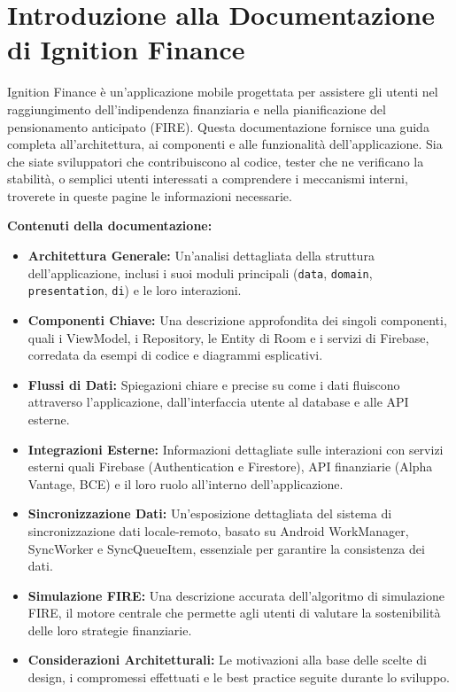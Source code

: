 \documentclass{article}
\begin{document}
    \tableofcontents

\section*{Introduzione alla Documentazione di Ignition Finance}

Ignition Finance è un'applicazione mobile progettata per assistere gli utenti
nel raggiungimento dell'indipendenza finanziaria e nella pianificazione del
pensionamento anticipato (FIRE). Questa documentazione fornisce una guida
completa all'architettura, ai componenti e alle funzionalità dell'applicazione.
Sia che siate sviluppatori che contribuiscono al codice, tester che ne
verificano la stabilità, o semplici utenti interessati a comprendere i
meccanismi interni, troverete in queste pagine le informazioni necessarie.
\vspace{0.5cm}

\textbf{Contenuti della documentazione:}

\begin{itemize}
    \item \textbf{Architettura Generale:} Un'analisi dettagliata della struttura
    dell'applicazione, inclusi i suoi moduli principali (\texttt{data},
    \texttt{domain}, \texttt{presentation}, \texttt{di}) e le loro interazioni.
    \item \textbf{Componenti Chiave:} Una descrizione approfondita dei singoli
    componenti, quali i ViewModel, i Repository, le Entity di Room e i servizi
    di Firebase, corredata da esempi di codice e diagrammi esplicativi.
    \item \textbf{Flussi di Dati:} Spiegazioni chiare e precise su come i dati
    fluiscono attraverso l'applicazione, dall'interfaccia utente al database e
    alle API esterne.
    \item \textbf{Integrazioni Esterne:} Informazioni dettagliate sulle
    interazioni con servizi esterni quali Firebase (Authentication e Firestore),
    API finanziarie (Alpha Vantage, BCE) e il loro ruolo all'interno
    dell'applicazione.
    \item \textbf{Sincronizzazione Dati:} Un'esposizione dettagliata del sistema
    di sincronizzazione dati locale-remoto, basato su Android WorkManager,
    SyncWorker e SyncQueueItem, essenziale per garantire la consistenza dei
    dati.
    \item \textbf{Simulazione FIRE:} Una descrizione accurata dell'algoritmo di
    simulazione FIRE, il motore centrale che permette agli utenti di valutare la
    sostenibilità delle loro strategie finanziarie.
    \item \textbf{Considerazioni Architetturali:} Le motivazioni alla base delle
    scelte di design, i compromessi effettuati e le best practice seguite
    durante lo sviluppo.
\end{itemize}
\end{document}
